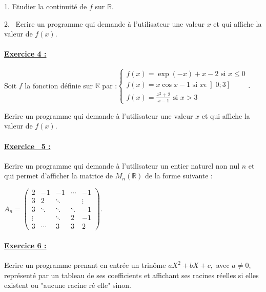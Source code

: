 \documentclass{article}
\begin{document}
1. Etudier la continuit\'{e} de $f$ sur $%
\mathbb{R}
.$

2. \ Ecrire un programme qui demande \`{a} l'utilisateur une valeur $x$ et
qui affiche la valeur de $f(x).$

\paragraph{\protect\underline{Exercice 4 :}}

Soit $f$ la fonction d\'{e}finie sur $\mathbb{R}$ par :$\left\{ 
\begin{array}{c}
f(x)=\exp (-x)+x-2\text{ si }x\leq 0 \\ 
f(x)=x\cos x-1\text{ \ si }x\epsilon \left] 0;3\right] \\ 
f(x)=\frac{x^{2}+2}{x-1}\text{ \ si }x>3%
\end{array}%
\right. .$

Ecrire un programme qui demande \`{a} l'utilisateur une valeur $x$ et qui
affiche la valeur de $f(x).$

\bigskip

\paragraph{\protect\underline{Exercice \ 5 :}}

Ecrire un programme qui demande \`{a} l'utilisateur un entier naturel non
nul $n$ et qui permet d'afficher la matrice de $M_{n}\left( 
\mathbb{R}
\right) $ de la forme suivante :

$A_{n}=\left( 
\begin{array}{ccccc}
2 & -1 & -1 & \cdots & -1 \\ 
3 & 2 & \ddots &  & \vdots \\ 
3 & \ddots & \ddots & \ddots & -1 \\ 
\vdots &  & \ddots & 2 & -1 \\ 
3 & \cdots & 3 & 3 & 2%
\end{array}%
\right) .$

\paragraph{\protect\underline{Exercice 6 :}}

Ecrire un programme prenant en entr\'{e}e un trin\^{o}me $aX^{2}+bX+c,$ avec 
$a\neq 0$, repr\'{e}sent\'{e} par un tableau de ses coefficients et
affichant ses racines r\'{e}elles si elles existent ou "aucune racine r\'{e}%
elle" sinon.
\end{document}
